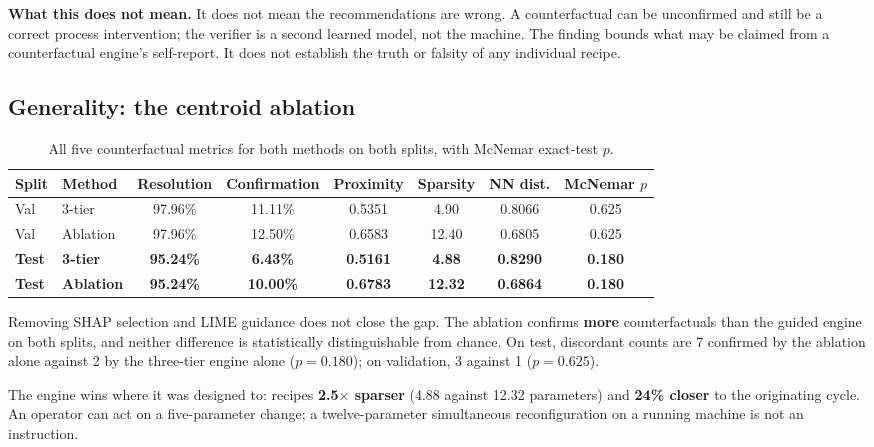\documentclass[11pt,a4paper]{article}
\begin{document}
\textbf{What this does not mean.} It does not mean the recommendations are wrong. A counterfactual can be unconfirmed and still be a correct process intervention; the verifier is a second learned model, not the machine. The finding bounds what may be claimed from a counterfactual engine's self-report. It does not establish the truth or falsity of any individual recipe.

\subsection{Generality: the centroid ablation}

\begin{table}[htbp]
\centering
\caption{All five counterfactual metrics for both methods on both splits, with McNemar exact-test $p$.}
\label{tab:ablation}
\small
\begin{tabular}{@{}llccccc c@{}}
\toprule
\textbf{Split} & \textbf{Method} & \textbf{Resolution} & \textbf{Confirmation} & \textbf{Proximity} & \textbf{Sparsity} & \textbf{NN dist.} & \textbf{McNemar $p$} \\
\midrule
Val  & 3-tier    & 97.96\% & 11.11\% & 0.5351 & 4.90  & 0.8066 & 0.625 \\
Val  & Ablation  & 97.96\% & 12.50\% & 0.6583 & 12.40 & 0.6805 & 0.625 \\
\textbf{Test} & \textbf{3-tier}   & \textbf{95.24\%} & \textbf{6.43\%}  & \textbf{0.5161} & \textbf{4.88}  & \textbf{0.8290} & \textbf{0.180} \\
\textbf{Test} & \textbf{Ablation} & \textbf{95.24\%} & \textbf{10.00\%} & \textbf{0.6783} & \textbf{12.32} & \textbf{0.6864} & \textbf{0.180} \\
\bottomrule
\end{tabular}
\end{table}

Removing SHAP selection and LIME guidance does not close the gap. The ablation confirms \textbf{more} counterfactuals than the guided engine on both splits, and neither difference is statistically distinguishable from chance. On test, discordant counts are 7 confirmed by the ablation alone against 2 by the three-tier engine alone ($p = 0.180$); on validation, 3 against 1 ($p = 0.625$).

The engine wins where it was designed to: recipes \textbf{2.5$\times$ sparser} (4.88 against 12.32 parameters) and \textbf{24\% closer} to the originating cycle. An operator can act on a five-parameter change; a twelve-parameter simultaneous reconfiguration on a running machine is not an instruction.
\end{document}
